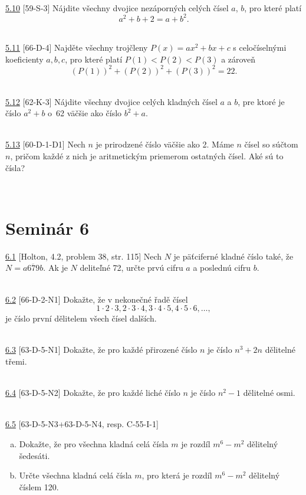 \\

\noindent \ul{5.10} [59-S-3] Nájdite všechny dvojice nezáporných celých čísel $a$, $b$, pro které platí
$$a^2 + b + 2 = a + b^2.$$


\\

\noindent \ul{5.11} [66-D-4]
Najděte všechny trojčleny $P(x)=ax^2+bx+c$ s celočíselnými koeficienty $a, b, c$, pro které platí $P(1) < P(2) < P(3)$ a zároveň $$(P(1))^2+ (P(2))^2+ (P(3))^2= 22.$$

\\

\noindent \ul{5.12} [62-K-3]
Nájdite všechny dvojice celých kladných čísel $a$ a $b$, pre ktoré je číslo $a^2 +b$ o~62 väčšie
ako číslo $b^2 + a$.


\\

\noindent \ul{5.13} [60-D-1-D1] Nech $n$ je prirodzené číslo väčšie ako 2. Máme $n$ čísel so súčtom $n$, pričom každé z nich je aritmetickým priemerom ostatných čísel. Aké sú to čísla?


\\

\section*{Seminár 6}

\noindent \ul{6.1} [Holton, 4.2, problem 38, str. 115] Nech $N$ je päťciferné kladné číslo také, že $N=\overline{a679b}$. Ak je $N$ deliteľné 72, určte prvú cifru $a$ a poslednú cifru $b$.


\\

\noindent \ul{6.2} [66-D-2-N1] Dokažte, že v nekonečné řadě čísel
$$ 1 \cdot 2 \cdot 3, 2 \cdot 3 \cdot 4, 3 \cdot 4 \cdot 5, 4 \cdot 5 \cdot 6, \ldots ,$$
je číslo první dělitelem všech čísel dalších.


\\

\noindent \ul{6.3} [63-D-5-N1] Dokažte, že pro každé přirozené číslo $n$ je číslo
$n^3+ 2n$ dělitelné třemi.


\\

\noindent \ul{6.4} [63-D-5-N2] Dokažte, že pro každé liché číslo $n$ je číslo
$n^2 - 1$ dělitelné osmi.


\\

\noindent \ul{6.5} [63-D-5-N3+63-D-5-N4, resp. C-55-I-1] \begin{enumerate}[a)]
\item Dokažte, že pro všechna kladná celá čísla $m$ je rozdíl $m^6 - m^2$ dělitelný šedesáti.
\item Určte všechna kladná celá čísla $m$, pro která je rozdíl $m^6 - m^2$ dělitelný číslem 120.
\end{enumerate}


